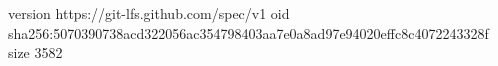 version https://git-lfs.github.com/spec/v1
oid sha256:5070390738acd322056ac354798403aa7e0a8ad97e94020effc8c4072243328f
size 3582
